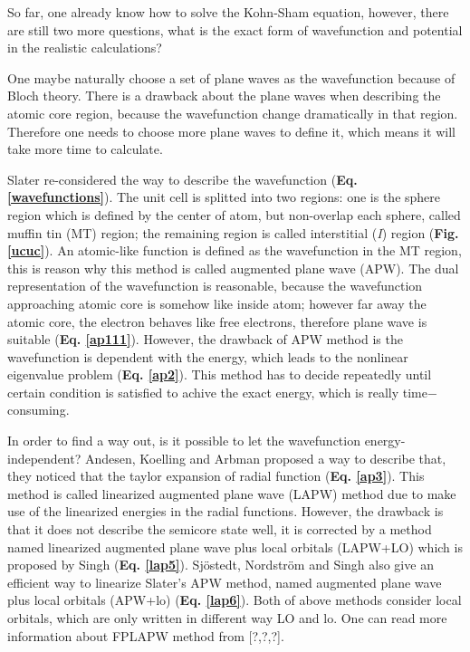 \documentclass[a4paper, 12pt, titlepage,oneside,drop]{kthesis}
\begin{document}
So far, one already know how to solve the Kohn-Sham equation, however, there are still two more questions, what is the exact form of 
wavefunction and potential in the realistic calculations?  

One maybe naturally choose a set of plane waves as the wavefunction because of Bloch theory. There is a drawback about the plane waves 
when describing the atomic core region, because the wavefunction change dramatically in that region. Therefore one needs to choose more plane
waves to define it, which means it will take more time to calculate.

Slater re-considered the way to describe the wavefunction (\textbf{Eq. \ref{wavefunctions}}). The unit cell is splitted into two regions: one is the sphere region which is
defined by the center of atom, but non-overlap each sphere, called muffin tin (MT) region; the remaining region is called interstitial (\textit{I})
region (\textbf{Fig. \ref{ucuc}}). An atomic-like function is defined as the wavefunction in the MT region, this is reason why this method is called augmented plane wave (APW).
The dual representation of the wavefunction is reasonable, because the wavefunction approaching atomic core is somehow like inside atom; however far away the atomic core, the electron behaves like free electrons,
therefore plane wave is suitable (\textbf{Eq. \ref{ap111}}). However, the drawback of APW method is the wavefunction is dependent with the energy, which leads to the 
nonlinear eigenvalue problem (\textbf{Eq. \ref{ap2}}). This method has to decide repeatedly until certain condition is satisfied to achive the exact energy, which is really time$-$consuming.

In order to find a way out, is it possible to let the wavefunction energy-independent? Andesen, Koelling and Arbman proposed a way to describe that,
they noticed that the taylor expansion of radial function (\textbf{Eq. \ref{ap3}}). This method is called linearized augmented plane wave (LAPW) method due to make use of the linearized energies in the radial functions. 
However, the drawback is that it does not describe the semicore state well, it is corrected by a method named linearized augmented plane wave plus local orbitals (LAPW+LO) which is proposed by Singh (\textbf{Eq. \ref{lap5}}).
Sjöstedt, Nordström and Singh also give an efficient way to linearize Slater's APW method, named augmented plane wave plus local orbitals (APW+lo) (\textbf{Eq. \ref{lap6}}). Both of above methods consider local orbitals, which are only
written in different way LO and lo. One can read more information about FPLAPW method from [?,?,?].
\end{document}
